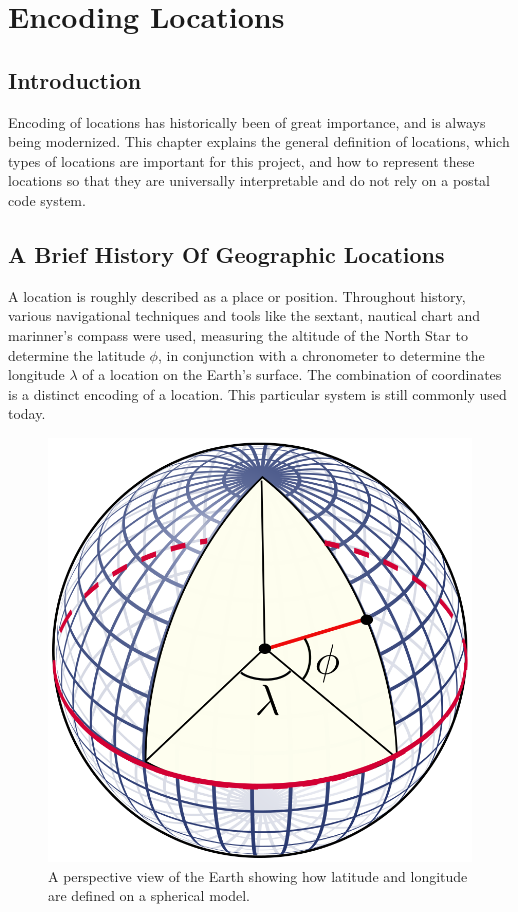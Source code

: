 \graphicspath{{Chapter2/Figs/Vector/}{Chapter2/Figs/}}

%
\chapter{Encoding Locations}
\section{Introduction}
Encoding of locations has historically been of great importance, and is always being modernized. This chapter explains the general definition of locations, which types of locations are important for this project, and how to represent these locations so that they are universally interpretable and do not rely on a postal code system.

%
\section{A Brief History Of Geographic Locations}
A location is roughly described as a place or position. Throughout history, various navigational techniques and tools like the sextant, nautical chart and marinner's compass were used, measuring the altitude of the North Star to determine the latitude $\phi$, in conjunction with a chronometer to determine the longitude $\lambda$ of a location on the Earth's surface. The combination of coordinates is a distinct encoding of a location. This particular system is still commonly used today.

\begin{figure}[htbp!]
	\centering
	\includegraphics[width=.2\textwidth]{LatLngSphere}
	\caption[LatLngSphere]{A perspective view of the Earth showing how latitude and longitude are defined on a spherical model.}
	\label{fig:latlngsphere}
\end{figure}

